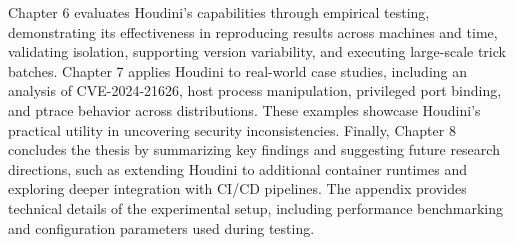 \documentclass[12pt]{report}
\begin{document}
\begin{doublespace}
Chapter 6 evaluates Houdini’s capabilities through empirical testing, demonstrating its effectiveness in reproducing results across machines and time, validating isolation, supporting version variability, and executing large-scale trick batches. Chapter 7 applies Houdini to real-world case studies, including an analysis of CVE-2024-21626, host process manipulation, privileged port binding, and ptrace behavior across distributions. These examples showcase Houdini’s practical utility in uncovering security inconsistencies. Finally, Chapter 8 concludes the thesis by summarizing key findings and suggesting future research directions, such as extending Houdini to additional container runtimes and exploring deeper integration with CI/CD pipelines. The appendix provides technical details of the experimental setup, including performance benchmarking and configuration parameters used during testing.

\end{doublespace} 	\fontsize{12pt}{14pt} \selectfont
\end{document}
